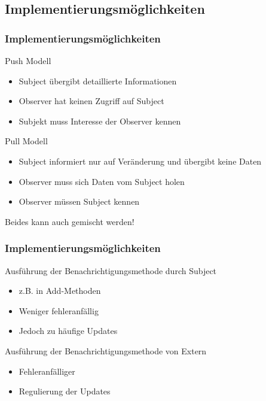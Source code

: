 \subsection{Implementierungsmöglichkeiten}
\begin{frame}
\frametitle{Implementierungsmöglichkeiten}
		\begin{block}{Push Modell}
		  \begin{itemize}
		  	\item Subject übergibt detaillierte Informationen 
		  	\item Observer hat keinen Zugriff auf Subject
		  	\item Subjekt muss Interesse der Observer kennen
		  \end{itemize}
  		\end{block}
  		\begin{block}{Pull Modell}
  		 \begin{itemize}
		  	\item Subject informiert nur auf Veränderung und übergibt keine Daten
		  	\item Observer muss sich Daten vom Subject holen
		  	\item Observer müssen Subject kennen
		  \end{itemize}  
  		\end{block}
  		Beides kann auch gemischt werden!
\end{frame}

\begin{frame}
\frametitle{Implementierungsmöglichkeiten}
		\begin{block}{Ausführung der Benachrichtigungsmethode durch Subject}
  		 \begin{itemize}
  		 	\item z.B. in Add-Methoden
		  	\item Weniger fehleranfällig
		  	\item Jedoch zu häufige Updates
		  \end{itemize}  
  		\end{block}		
  		\begin{block}{Ausführung der Benachrichtigungsmethode von Extern}
		  \begin{itemize}
		  	\item Fehleranfälliger
		  	\item Regulierung der Updates
		  \end{itemize}
  		\end{block}	
\end{frame}

